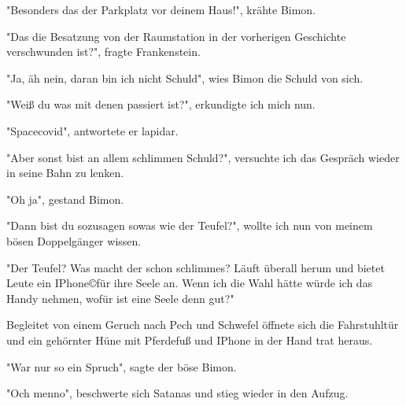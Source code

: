 \documentclass[ebook]{article}
\begin{document}
\begin{center}
"Besonders das der Parkplatz vor deinem Haus!", krähte Bimon.
\end{center}

\begin{center}
"Das die Besatzung von der Raumstation in der vorherigen Geschichte
verschwunden ist?", fragte Frankenstein.
\end{center}

\begin{center}
"Ja, äh nein, daran bin ich nicht Schuld", wies Bimon die Schuld von sich.
\end{center}

\begin{center}
"Weiß du was mit denen passiert ist?", erkundigte ich mich nun.
\end{center}

\begin{center}
"Spacecovid", antwortete er lapidar.
\end{center}

\begin{center}
"Aber sonst bist an allem schlimmen Schuld?", versuchte ich das
Gespräch wieder in seine Bahn zu lenken.
\end{center}

\begin{center}
"Oh ja", gestand Bimon.
\end{center}

\begin{center}
"Dann bist du sozusagen sowas wie der Teufel?", wollte ich nun von
meinem bösen Doppelgänger wissen.
\end{center}

\begin{center}
"Der Teufel? Was macht der schon schlimmes? Läuft überall herum und
bietet Leute ein IPhone\copyright für ihre Seele an. Wenn ich die
Wahl hätte würde ich das Handy nehmen, wofür ist eine Seele denn
gut?"
\end{center}

\noindent Begleitet von einem Geruch nach Pech und Schwefel öffnete
sich die Fahrstuhltür und ein gehörnter Hüne mit Pferdefuß und
IPhone in der Hand trat heraus.

\begin{center}
"War nur so ein Spruch", sagte der böse Bimon.
\end{center}

\begin{center}
"Och menno", beschwerte sich Satanas und stieg wieder in den Aufzug.
\end{center}
\end{document}
